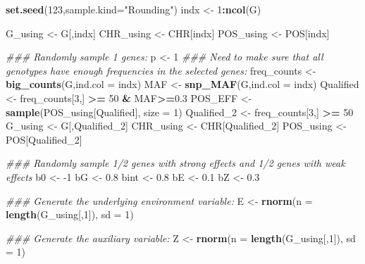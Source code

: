 \documentclass[
]{article}
\newenvironment{Shaded}{\begin{snugshade}}{\end{snugshade}}
\newcommand{\CommentTok}[1]{\textcolor[rgb]{0.56,0.35,0.01}{\textit{#1}}}
\newcommand{\DataTypeTok}[1]{\textcolor[rgb]{0.13,0.29,0.53}{#1}}
\newcommand{\DecValTok}[1]{\textcolor[rgb]{0.00,0.00,0.81}{#1}}
\newcommand{\FloatTok}[1]{\textcolor[rgb]{0.00,0.00,0.81}{#1}}
\newcommand{\KeywordTok}[1]{\textcolor[rgb]{0.13,0.29,0.53}{\textbf{#1}}}
\newcommand{\NormalTok}[1]{#1}
\newcommand{\OperatorTok}[1]{\textcolor[rgb]{0.81,0.36,0.00}{\textbf{#1}}}
\newcommand{\StringTok}[1]{\textcolor[rgb]{0.31,0.60,0.02}{#1}}
\begin{document}
\begin{Shaded}
\begin{Highlighting}[]
\KeywordTok{set.seed}\NormalTok{(}\DecValTok{123}\NormalTok{,}\DataTypeTok{sample.kind=}\StringTok{"Rounding"}\NormalTok{)}
\NormalTok{indx <-}\StringTok{ }\DecValTok{1}\OperatorTok{:}\KeywordTok{ncol}\NormalTok{(G)}

\NormalTok{G_using <-}\StringTok{ }\NormalTok{G[,indx]}
\NormalTok{CHR_using <-}\StringTok{ }\NormalTok{CHR[indx]}
\NormalTok{POS_using <-}\StringTok{ }\NormalTok{POS[indx]}


\CommentTok{### Randomly sample 1 genes:}
\NormalTok{p <-}\StringTok{ }\DecValTok{1}
\CommentTok{### Need to make sure that all genotypes have enough frequencies in the selected genes:}
\NormalTok{freq_counts <-}\StringTok{ }\KeywordTok{big_counts}\NormalTok{(G,}\DataTypeTok{ind.col =}\NormalTok{ indx)}
\NormalTok{MAF <-}\StringTok{ }\KeywordTok{snp_MAF}\NormalTok{(G,}\DataTypeTok{ind.col =}\NormalTok{ indx)}
\NormalTok{Qualified <-}\StringTok{ }\NormalTok{freq_counts[}\DecValTok{3}\NormalTok{,] }\OperatorTok{>=}\StringTok{ }\DecValTok{50} \OperatorTok{&}\StringTok{ }\NormalTok{MAF}\OperatorTok{>=}\FloatTok{0.3}
\NormalTok{POS_EFF <-}\StringTok{ }\KeywordTok{sample}\NormalTok{(POS_using[Qualified], }\DataTypeTok{size =} \DecValTok{1}\NormalTok{)}
\NormalTok{Qualified_}\DecValTok{2}\NormalTok{ <-}\StringTok{ }\NormalTok{freq_counts[}\DecValTok{3}\NormalTok{,] }\OperatorTok{>=}\StringTok{ }\DecValTok{50}
\NormalTok{G_using <-}\StringTok{ }\NormalTok{G[,Qualified_}\DecValTok{2}\NormalTok{]}
\NormalTok{CHR_using <-}\StringTok{ }\NormalTok{CHR[Qualified_}\DecValTok{2}\NormalTok{]}
\NormalTok{POS_using <-}\StringTok{ }\NormalTok{POS[Qualified_}\DecValTok{2}\NormalTok{]}


\CommentTok{### Randomly sample 1/2 genes with strong effects and 1/2 genes with weak effects}
\NormalTok{b0 <-}\StringTok{ }\DecValTok{-1}
\NormalTok{bG <-}\StringTok{ }\FloatTok{0.8}
\NormalTok{bint <-}\StringTok{ }\FloatTok{0.8}
\NormalTok{bE <-}\StringTok{ }\FloatTok{0.1}
\NormalTok{bZ <-}\StringTok{ }\FloatTok{0.3}

\CommentTok{### Generate the underlying environment variable:}
\NormalTok{E <-}\StringTok{ }\KeywordTok{rnorm}\NormalTok{(}\DataTypeTok{n =} \KeywordTok{length}\NormalTok{(G_using[,}\DecValTok{1}\NormalTok{]), }\DataTypeTok{sd =} \DecValTok{1}\NormalTok{)}

\CommentTok{### Generate the auxiliary variable:}
\NormalTok{Z <-}\StringTok{ }\KeywordTok{rnorm}\NormalTok{(}\DataTypeTok{n =} \KeywordTok{length}\NormalTok{(G_using[,}\DecValTok{1}\NormalTok{]), }\DataTypeTok{sd =} \DecValTok{1}\NormalTok{)}


\end{Highlighting}
\end{Shaded}
\end{document}
